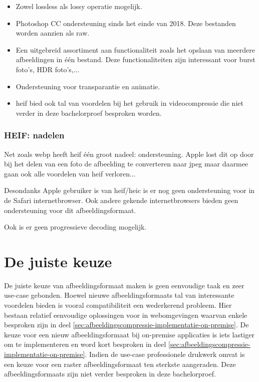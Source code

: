 \begin{itemize}
	\item Zowel \gls{lossless} als \gls{lossy} operatie mogelijk.
	
	\item Photoshop CC ondersteuning sinds het einde van 2018. Deze bestanden worden aanzien als \gls{raw}.
	
	\item Een uitgebreid assortiment aan functionaliteit zoals het opslaan van meerdere afbeeldingen in één bestand. Deze functionaliteiten zijn interessant voor burst foto's, HDR foto's,...
	
	\item Ondersteuning voor transparantie en animatie.
	
	\item \Gls{heif} bied ook tal van voordelen bij het gebruik in \gls{videocompressie} die niet verder in deze bachelorproef besproken worden.
\end{itemize}

\subsubsection{HEIF: nadelen}
\label{sec:afbeeldingscompressie-heif-nadelen}

Net zoals \gls{webp} heeft \gls{heif} één groot nadeel: ondersteuning. Apple lost dit op door bij het delen van een foto de afbeelding te converteren naar \gls{jpeg} maar daarmee gaan ook alle voordelen van \gls{heif} verloren... 

Desondanks Apple gebruiker is van \gls{heif}/\gls{heic} is er nog geen ondersteuning voor in de Safari internetbrowser. Ook andere gekende internetbrowsers bieden geen ondersteuning voor dit \gls{afbeeldingsformaat}.

Ook is er geen progressieve \gls{decoding} mogelijk.

\section{De juiste keuze}
\label{sec:afbeeldingscompressie-keuze}

De juiste keuze van \gls{afbeeldingsformaat} maken is geen eenvoudige taak en zeer \gls{use-case} gebonden. Hoewel nieuwe \glspl{afbeeldingsformaat} tal van interessante voordelen bieden is vooral compatibiliteit een wederkerend probleem. Hier bestaan relatief eenvoudige oplossingen voor in webomgevingen waarvan enkele besproken zijn in deel \ref{sec:afbeeldingscompressie-implementatie-on-premise}. De keuze voor een nieuw \gls{afbeeldingsformaat} bij \gls{on-premise} applicaties is iets lastiger om te implementeren en word kort besproken in deel \ref{sec:afbeeldingscompressie-implementatie-on-premise}. Indien de \gls{use-case} professionele drukwerk omvat is een keuze voor een \gls{raster} \gls{afbeeldingsformaat} ten sterkste aangeraden. Deze \glspl{afbeeldingsformaat} zijn niet verder besproken in deze bachelorproef.


